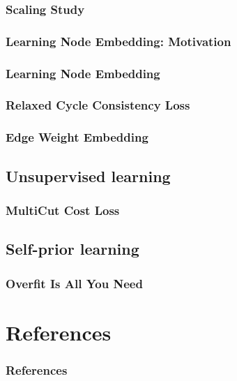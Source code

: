 \documentclass{beamer}
\begin{document}
\begin{frame}
    \frametitle{Scaling Study}



\end{frame}

\begin{frame}
    \frametitle{Learning Node Embedding: Motivation}



\end{frame}

\begin{frame}
    \frametitle{Learning Node Embedding}



\end{frame}

\begin{frame}
    \frametitle{Relaxed Cycle Consistency Loss}

\end{frame}

\begin{frame}
    \frametitle{Edge Weight Embedding}



\end{frame}

\subsection{Unsupervised learning}

\begin{frame}
    \frametitle{MultiCut Cost Loss}



\end{frame}

\subsection{Self-prior learning}

\begin{frame}
    \frametitle{Overfit Is All You Need}



\end{frame}

\section*{References}

\begin{frame}[allowframebreaks]
    \frametitle{References}

    
    
\end{frame}
\end{document}

